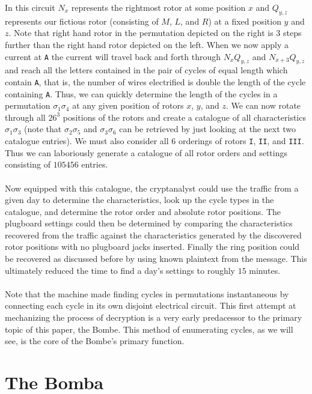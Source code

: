 In this circuit $N_x$ represents the rightmost rotor at some position
$x$ and $Q_{y,z}$ represents our fictious rotor (consisting of $M$,
$L$, and $R$) at a fixed position $y$ and $z$. Note that right hand
rotor in the permutation depicted on the right is 3 steps further
than the right hand rotor depicted on the left. When we now apply a
current at \texttt{A} the current will travel back and forth through
$N_xQ_{y,z}$ and $N_{x+3}Q_{y,z}$ and reach all the letters contained
in the pair of cycles of equal length which contain \texttt{A}, that
is, the number of wires electrified is double the length of the cycle
containing \texttt{A}. Thus, we can quickly determine the length of
the cycles in a permutation $\sigma_1\sigma_{4}$ at any given
position of rotors ${x}$, $y$, and $z$. We can now rotate through all
$26^3$ positions of the rotors and create a catalogue of all
characteristics $\sigma_1\sigma_3$ (note that $\sigma_2\sigma_5$ and
  $\sigma_3\sigma_6$ can be retrieved by just looking at the next two
catalogue entries). We must also consider all 6 orderings of rotors
\texttt{I}, \texttt{II}, and \texttt{III}. Thus we can laboriously
generate a catalogue of all rotor orders and settings consisting of
$105456$ entries.
\\\\Now equipped with this catalogue, the cryptanalyst could use the
traffic from a given day to determine the characteristics, look up
the cycle types in the catalogue, and determine the rotor order and
absolute rotor positions. The plugboard settings could then be
determined by comparing the characteristics recovered from the
traffic against the characteristics generated by the discovered rotor
positions with no plugboard jacks inserted. Finally the ring position
could be recovered as discussed before by using known plaintext from
the message. This ultimately reduced the time to find a day's
settings to roughly $15$ minutes.
\\\\Note that the machine made finding cycles in permutations
instantaneous by connecting each cycle in its own disjoint electrical
circuit. This first attempt at mechanizing the process of decryption
is a very early predacessor to the primary topic of this paper, the
Bombe. This method of enumerating cycles, as we will see, is the core
of the Bombe's primary function.
\section{The Bomba}


